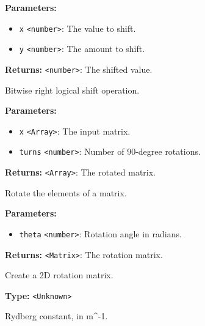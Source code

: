 \documentclass[12pt,a4paper]{article}
\begin{document}
\noindent \textbf{Parameters:}
\begin{itemize}
  \item \texttt{x} \texttt{<number>}: The value to shift.
  \item \texttt{y} \texttt{<number>}: The amount to shift.
\end{itemize}

\noindent \textbf{Returns:} \texttt{<number>}: The shifted value.

\noindent Bitwise right logical shift operation.

\vspace{5mm}
\noindent {}


\noindent \textbf{Parameters:}
\begin{itemize}
  \item \texttt{x} \texttt{<Array>}: The input matrix.
  \item \texttt{turns} \texttt{<number>}: Number of 90-degree rotations.
\end{itemize}

\noindent \textbf{Returns:} \texttt{<Array>}: The rotated matrix.

\noindent Rotate the elements of a matrix.

\vspace{5mm}
\noindent {}


\noindent \textbf{Parameters:}
\begin{itemize}
  \item \texttt{theta} \texttt{<number>}: Rotation angle in radians.
\end{itemize}

\noindent \textbf{Returns:} \texttt{<Matrix>}: The rotation matrix.

\noindent Create a 2D rotation matrix.

\vspace{5mm}
\noindent {}\vspace{4mm}


\noindent \textbf{Type:} \texttt{<Unknown>}

\noindent Rydberg constant, in m\textasciicircum{}-1.
\end{document}
